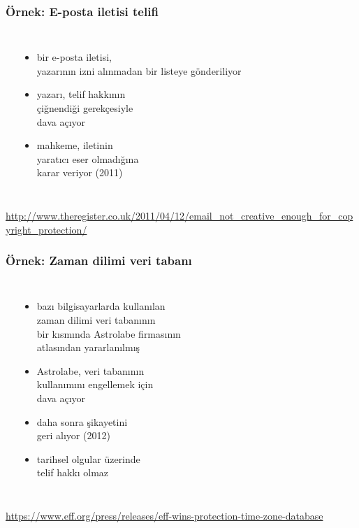 \documentclass[dvipsnames]{beamer}
\theoremstyle{plain}
\begin{document}
\begin{frame}
  \frametitle{Örnek: E-posta iletisi telifi}

  \begin{columns}
    \begin{center}
    \end{center}

    \begin{itemize}
      \item bir e-posta iletisi,\\
        yazarının izni alınmadan\/
        bir listeye gönderiliyor
      \item yazarı, telif hakkının\\
        çiğnendiği gerekçesiyle\\
        dava açıyor
      \item mahkeme, iletinin\\
        yaratıcı eser olmadığına\\
        karar veriyor (2011)
    \end{itemize}
  \end{columns}

  \medskip
  \tiny{\url{http://www.theregister.co.uk/2011/04/12/email_not_creative_enough_for_copyright_protection/}}\\
\end{frame}

\begin{frame}
  \frametitle{Örnek: Zaman dilimi veri tabanı}

  \begin{columns}
    \begin{center}
    \end{center}

    \begin{itemize}
      \item bazı bilgisayarlarda kullanılan\\
        zaman dilimi veri tabanının\\
        bir kısmında Astrolabe firmasının\\
        atlasından yararlanılmış
      \item Astrolabe, veri tabanının\\
        kullanımını engellemek için\\
        dava açıyor
      \item daha sonra şikayetini\\
        geri alıyor (2012)
      \item tarihsel olgular üzerinde\\
        telif hakkı olmaz
    \end{itemize}
  \end{columns}

  \medskip
  \tiny{\url{https://www.eff.org/press/releases/eff-wins-protection-time-zone-database}}\\
\end{frame}
\end{document}

